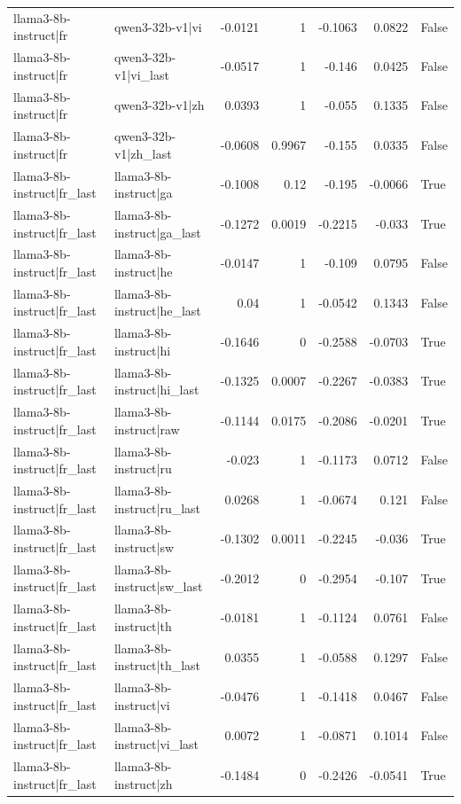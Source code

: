 \begin{table}
\begin{tabular}{l l r r r r l}
llama3-8b-instruct|fr & qwen3-32b-v1|vi & -0.0121 & 1 & -0.1063 & 0.0822 & False \\
llama3-8b-instruct|fr & qwen3-32b-v1|vi_last & -0.0517 & 1 & -0.146 & 0.0425 & False \\
llama3-8b-instruct|fr & qwen3-32b-v1|zh & 0.0393 & 1 & -0.055 & 0.1335 & False \\
llama3-8b-instruct|fr & qwen3-32b-v1|zh_last & -0.0608 & 0.9967 & -0.155 & 0.0335 & False \\
llama3-8b-instruct|fr_last & llama3-8b-instruct|ga & -0.1008 & 0.12 & -0.195 & -0.0066 & True \\
llama3-8b-instruct|fr_last & llama3-8b-instruct|ga_last & -0.1272 & 0.0019 & -0.2215 & -0.033 & True \\
llama3-8b-instruct|fr_last & llama3-8b-instruct|he & -0.0147 & 1 & -0.109 & 0.0795 & False \\
llama3-8b-instruct|fr_last & llama3-8b-instruct|he_last & 0.04 & 1 & -0.0542 & 0.1343 & False \\
llama3-8b-instruct|fr_last & llama3-8b-instruct|hi & -0.1646 & 0 & -0.2588 & -0.0703 & True \\
llama3-8b-instruct|fr_last & llama3-8b-instruct|hi_last & -0.1325 & 0.0007 & -0.2267 & -0.0383 & True \\
llama3-8b-instruct|fr_last & llama3-8b-instruct|raw & -0.1144 & 0.0175 & -0.2086 & -0.0201 & True \\
llama3-8b-instruct|fr_last & llama3-8b-instruct|ru & -0.023 & 1 & -0.1173 & 0.0712 & False \\
llama3-8b-instruct|fr_last & llama3-8b-instruct|ru_last & 0.0268 & 1 & -0.0674 & 0.121 & False \\
llama3-8b-instruct|fr_last & llama3-8b-instruct|sw & -0.1302 & 0.0011 & -0.2245 & -0.036 & True \\
llama3-8b-instruct|fr_last & llama3-8b-instruct|sw_last & -0.2012 & 0 & -0.2954 & -0.107 & True \\
llama3-8b-instruct|fr_last & llama3-8b-instruct|th & -0.0181 & 1 & -0.1124 & 0.0761 & False \\
llama3-8b-instruct|fr_last & llama3-8b-instruct|th_last & 0.0355 & 1 & -0.0588 & 0.1297 & False \\
llama3-8b-instruct|fr_last & llama3-8b-instruct|vi & -0.0476 & 1 & -0.1418 & 0.0467 & False \\
llama3-8b-instruct|fr_last & llama3-8b-instruct|vi_last & 0.0072 & 1 & -0.0871 & 0.1014 & False \\
llama3-8b-instruct|fr_last & llama3-8b-instruct|zh & -0.1484 & 0 & -0.2426 & -0.0541 & True \\

\end{tabular}
\end{table}
